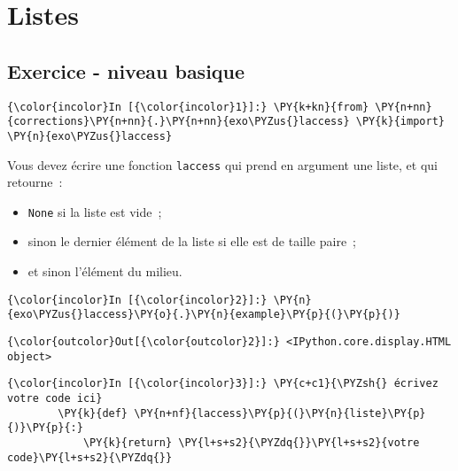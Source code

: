     
    
    
    

    

    \hypertarget{listes}{%
\section{Listes}\label{listes}}

    \hypertarget{exercice---niveau-basique}{%
\subsection{Exercice - niveau basique}\label{exercice---niveau-basique}}

    \begin{Verbatim}[commandchars=\\\{\}]
{\color{incolor}In [{\color{incolor}1}]:} \PY{k+kn}{from} \PY{n+nn}{corrections}\PY{n+nn}{.}\PY{n+nn}{exo\PYZus{}laccess} \PY{k}{import} \PY{n}{exo\PYZus{}laccess}
\end{Verbatim}


    Vous devez écrire une fonction \texttt{laccess} qui prend en argument
une liste, et qui retourne~:

\begin{itemize}
\tightlist
\item
  \texttt{None} si la liste est vide~;
\item
  sinon le dernier élément de la liste si elle est de taille paire~;
\item
  et sinon l'élément du milieu.
\end{itemize}

    \begin{Verbatim}[commandchars=\\\{\}]
{\color{incolor}In [{\color{incolor}2}]:} \PY{n}{exo\PYZus{}laccess}\PY{o}{.}\PY{n}{example}\PY{p}{(}\PY{p}{)}
\end{Verbatim}


\begin{Verbatim}[commandchars=\\\{\}]
{\color{outcolor}Out[{\color{outcolor}2}]:} <IPython.core.display.HTML object>
\end{Verbatim}
            
    \begin{Verbatim}[commandchars=\\\{\}]
{\color{incolor}In [{\color{incolor}3}]:} \PY{c+c1}{\PYZsh{} écrivez votre code ici}
        \PY{k}{def} \PY{n+nf}{laccess}\PY{p}{(}\PY{n}{liste}\PY{p}{)}\PY{p}{:}
            \PY{k}{return} \PY{l+s+s2}{\PYZdq{}}\PY{l+s+s2}{votre code}\PY{l+s+s2}{\PYZdq{}}
\end{Verbatim}


